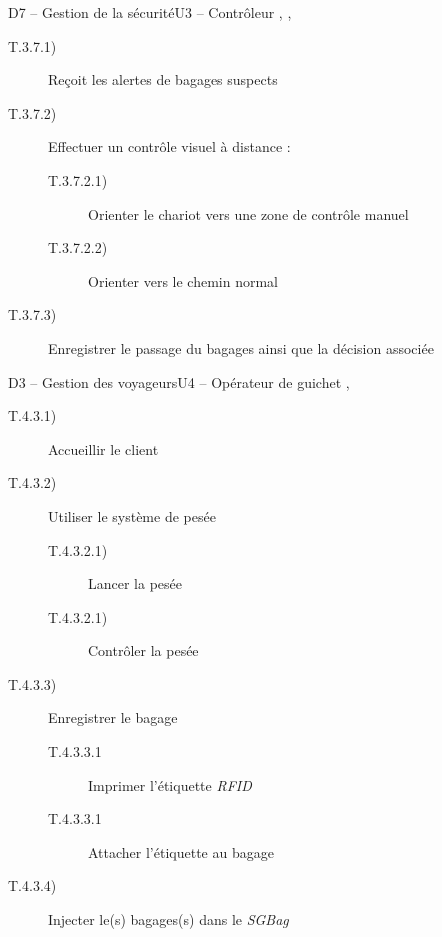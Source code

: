 \dta
{D7 -- Gestion de la sécurité}{U3 -- Contrôleur}
{, , }
{
\begin{description}
	\item [T.3.7.1)] Reçoit les alertes de bagages suspects \typeactivite{[système]}
	\item [T.3.7.2)] Effectuer un contrôle visuel à distance : 
	\begin{description}
		\item [T.3.7.2.1)] Orienter le chariot vers une zone de contrôle manuel \typeactivite{[système]}
		\item [T.3.7.2.2)] Orienter vers le chemin \og normal\fg \typeactivite{[système]}
	\end{description}
	\item [T.3.7.3)] Enregistrer le passage du bagages ainsi que la décision associée \typeactivite{[système]}
\end{description}
}

\dta
{D3 -- Gestion des voyageurs}{U4 -- Opérateur de guichet}
{, }
{
\begin{description}
	\item [T.4.3.1)] Accueillir le client \typeactivite{[manuel]}
	\item [T.4.3.2)] Utiliser le système de pesée 
	\begin{description}
		\item [T.4.3.2.1)] Lancer la pesée \typeactivite{[système]}
		\item [T.4.3.2.1)] Contrôler la pesée \typeactivite{[système]}
	\end{description}
	\item [T.4.3.3)] Enregistrer le bagage 
	\begin{description}
		\item [T.4.3.3.1] Imprimer l'étiquette \textsl{RFID} \typeactivite{[système]}
		\item [T.4.3.3.1] Attacher l'étiquette au bagage \typeactivite{[système]}
	\end{description}
	\item [T.4.3.4)] Injecter le(s) bagages(s) dans le \textsl{SGBag} \typeactivite{[système]}
\end{description}
}

